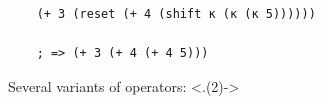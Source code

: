 \begin{frame}[fragile]
	\frametitlesubs

	\begin{verbatim}
    (+ 3 (reset (+ 4 (shift κ (κ (κ 5))))))

    ; => (+ 3 (+ 4 (+ 4 5)))
  \end{verbatim}

	\pause
	\begin{minipage}[t]{.49\textwidth}
		Several variants of operators:
		\only<.(2)->{\baselineskip}


\end{minipage}
\end{frame}
